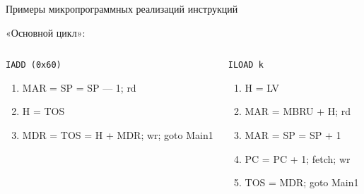 \begin{frame}{Примеры микропрограммных реализаций инструкций}
    \ttfamily\small

\pause
«Основной цикл»:\\

\begin{columns}
        \column{5.5cm}

    \pause
    \begin{block}{\texttt{IADD (0x60)}}
    \pause
    \begin{enumerate}
        \item MAR = SP = SP — 1; rd
        \item H = TOS
        \item MDR = TOS = H + MDR; wr; goto Main1
    \end{enumerate}
    \end{block}

        \column{5.5cm}
    \pause
    \begin{block}{\texttt{ILOAD k}}
    \begin{enumerate}
        \item H = LV
        \item MAR = MBRU + H; rd
        \item MAR = SP = SP + 1
        \item PC = PC + 1; fetch; wr
        \item TOS = MDR; goto Main1
    \end{enumerate}
    \end{block}

\end{columns}
\end{frame}



